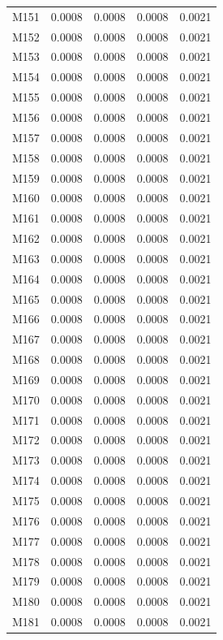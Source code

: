 \begin{longtable}{lrrrr}
M151 & 0.0008 & 0.0008 & 0.0008 & 0.0021 \\
M152 & 0.0008 & 0.0008 & 0.0008 & 0.0021 \\
M153 & 0.0008 & 0.0008 & 0.0008 & 0.0021 \\
M154 & 0.0008 & 0.0008 & 0.0008 & 0.0021 \\
M155 & 0.0008 & 0.0008 & 0.0008 & 0.0021 \\
M156 & 0.0008 & 0.0008 & 0.0008 & 0.0021 \\
M157 & 0.0008 & 0.0008 & 0.0008 & 0.0021 \\
M158 & 0.0008 & 0.0008 & 0.0008 & 0.0021 \\
M159 & 0.0008 & 0.0008 & 0.0008 & 0.0021 \\
M160 & 0.0008 & 0.0008 & 0.0008 & 0.0021 \\
M161 & 0.0008 & 0.0008 & 0.0008 & 0.0021 \\
M162 & 0.0008 & 0.0008 & 0.0008 & 0.0021 \\
M163 & 0.0008 & 0.0008 & 0.0008 & 0.0021 \\
M164 & 0.0008 & 0.0008 & 0.0008 & 0.0021 \\
M165 & 0.0008 & 0.0008 & 0.0008 & 0.0021 \\
M166 & 0.0008 & 0.0008 & 0.0008 & 0.0021 \\
M167 & 0.0008 & 0.0008 & 0.0008 & 0.0021 \\
M168 & 0.0008 & 0.0008 & 0.0008 & 0.0021 \\
M169 & 0.0008 & 0.0008 & 0.0008 & 0.0021 \\
M170 & 0.0008 & 0.0008 & 0.0008 & 0.0021 \\
M171 & 0.0008 & 0.0008 & 0.0008 & 0.0021 \\
M172 & 0.0008 & 0.0008 & 0.0008 & 0.0021 \\
M173 & 0.0008 & 0.0008 & 0.0008 & 0.0021 \\
M174 & 0.0008 & 0.0008 & 0.0008 & 0.0021 \\
M175 & 0.0008 & 0.0008 & 0.0008 & 0.0021 \\
M176 & 0.0008 & 0.0008 & 0.0008 & 0.0021 \\
M177 & 0.0008 & 0.0008 & 0.0008 & 0.0021 \\
M178 & 0.0008 & 0.0008 & 0.0008 & 0.0021 \\
M179 & 0.0008 & 0.0008 & 0.0008 & 0.0021 \\
M180 & 0.0008 & 0.0008 & 0.0008 & 0.0021 \\
M181 & 0.0008 & 0.0008 & 0.0008 & 0.0021 \\

\end{longtable}
